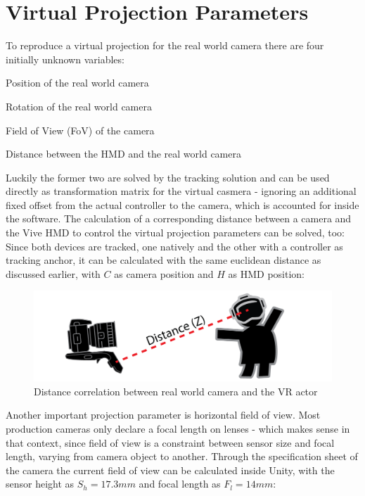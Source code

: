 %
\section{Virtual Projection Parameters}
\label{sec:projection-params}
To reproduce a virtual projection for the real world camera there are four 
initially unknown variables:

\begin{my_list}
	\item Position of the real world camera
	\item Rotation of the real world camera
	\item Field of View (FoV) of the camera
	\item Distance between the HMD and the real world camera
\end{my_list}

Luckily the former two are solved by the tracking solution and can be used 
directly as transformation matrix for the virtual casmera - ignoring an 
additional fixed offset from the actual controller to the camera, which is 
accounted for inside the software.
\newline
The calculation of a corresponding distance between a camera and the Vive HMD 
to control the virtual projection parameters can be solved, too: Since both 
devices are tracked, one natively and the other with a controller as 
tracking anchor, it can be calculated with the same euclidean distance as 
discussed earlier, with $C$ as camera position and $H$ as HMD position:


\begin{figure}[htb]
	\includegraphics[width=\textwidth]{gfx/distance-z.png}
	\caption{Distance correlation between real world camera and the VR actor}
	\label{fig:projection:distance}
\end{figure}

Another important projection parameter is horizontal field of view. Most 
production cameras only declare a focal length on lenses - which makes sense in 
that context, since field of view is a constraint between sensor size and focal 
length, varying from camera object to another. Through the specification sheet 
of the camera the current field of view can be calculated inside Unity, with 
the sensor height as $S_h = 17.3mm$ and focal length as $F_l = 14mm$:

